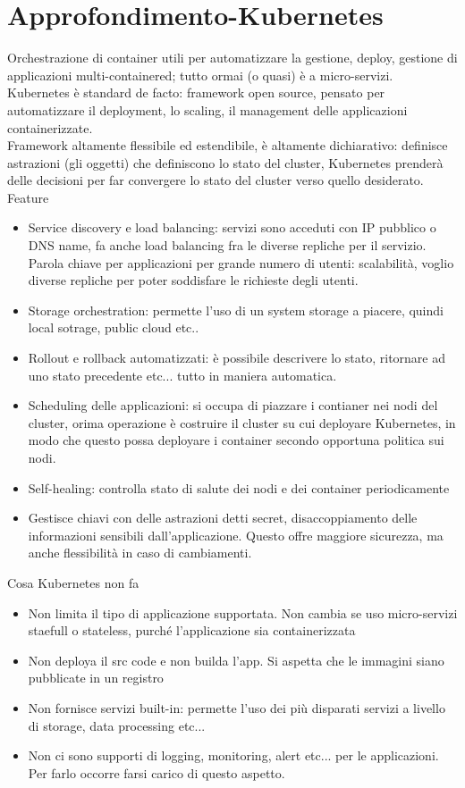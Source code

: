 \documentclass[16px]{article}
\begin{document}
\section{Approfondimento-Kubernetes}
Orchestrazione di container utili per automatizzare la gestione, deploy, gestione di applicazioni multi-containered; tutto ormai (o quasi) è a micro-servizi. Kubernetes è standard de facto: framework open source, pensato per automatizzare il deployment, lo scaling, il management delle applicazioni containerizzate.\\ Framework altamente flessibile ed estendibile, è altamente dichiarativo: definisce astrazioni (gli oggetti) che definiscono lo stato del cluster, Kubernetes prenderà delle decisioni per far convergere lo stato del cluster verso quello desiderato.\\ Feature
\begin{itemize}
\item Service discovery e load balancing: servizi sono acceduti con IP pubblico o DNS name, fa anche load balancing fra le diverse repliche per il servizio. Parola chiave per applicazioni per grande numero di utenti: scalabilità, voglio diverse repliche per poter soddisfare le richieste degli utenti.
\item Storage orchestration: permette l'uso di un system storage a piacere, quindi local sotrage, public cloud etc..
\item Rollout e rollback automatizzati: è possibile descrivere lo stato, ritornare ad uno stato precedente etc... tutto in maniera automatica.
\item Scheduling delle applicazioni: si occupa di piazzare i contianer nei nodi del cluster, orima operazione è costruire il cluster su cui deployare Kubernetes, in modo che questo possa deployare i container secondo opportuna politica sui nodi.
\item Self-healing: controlla stato di salute dei nodi e dei container periodicamente
\item Gestisce chiavi con delle astrazioni detti secret, disaccoppiamento delle informazioni sensibili dall'applicazione. Questo offre maggiore sicurezza, ma anche flessibilità in caso di cambiamenti.
\end{itemize}
Cosa Kubernetes non fa
\begin{itemize}
\item Non limita il tipo di applicazione supportata. Non cambia se uso micro-servizi staefull o stateless, purché l'applicazione sia containerizzata
\item Non deploya il src code e non builda l'app. Si aspetta che le immagini siano pubblicate in un registro
\item Non fornisce servizi built-in: permette l'uso dei più disparati servizi a livello di storage, data processing etc... 
\item Non ci sono supporti di logging, monitoring, alert etc... per le applicazioni. Per farlo occorre farsi carico di questo aspetto.
\end{itemize}
\end{document}
